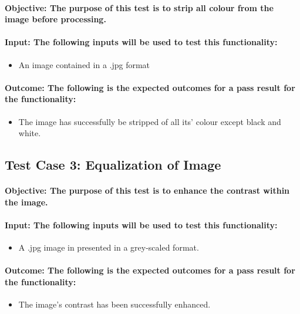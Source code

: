 \documentclass[a4paper,12pt]{report}
\begin{document}
	\paragraph{Objective: The purpose of this test is to strip all colour from the image before processing.}
	\paragraph{Input: The following inputs will be used to test this functionality:}
	\begin{itemize}
		\item An image contained in a .jpg format
	\end{itemize}
	\paragraph{Outcome: The following is the expected outcomes for a pass result for the functionality:}
	\begin{itemize}
		\item The image has successfully be stripped of all its' colour except black and white.
	\end{itemize}	
		
	\subsection{Test Case 3: Equalization of Image}
	\paragraph{Objective: The purpose of this test is to enhance the contrast within the image.}
	\paragraph{Input: The following inputs will be used to test this functionality:}
	\begin{itemize}
		\item A .jpg image in presented in a grey-scaled format.
	\end{itemize}
	\paragraph{Outcome: The following is the expected outcomes for a pass result for the functionality:}
	\begin{itemize}
		\item The image's contrast has been successfully enhanced.
	\end{itemize}
		
\end{document}
